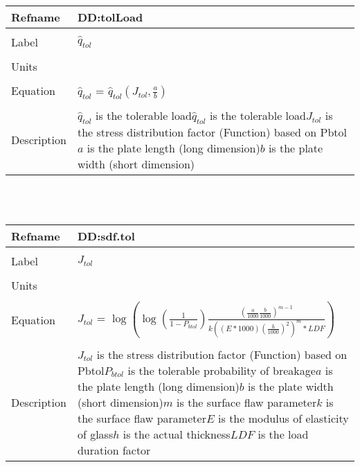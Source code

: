 \documentclass[12pt]{article}
\begin{document}
~\newline
\noindent \begin{minipage}{\textwidth}
\begin{tabular}{p{} p{}}
\toprule \textbf{Refname} & \textbf{DD:tolLoad}
\label{DD:tolLoad}
\\ \midrule \\
Label & $\hat{q}_{tol}$
\\ \midrule \\
Units & 
\\ \midrule \\
Equation & $\hat{q}_{tol}$ = $\hat{q}_{tol}(J_{tol},\frac{a}{b})$
\\ \midrule \\
Description & $\hat{q}_{tol}$ is the tolerable load\newline$\hat{q}_{tol}$ is the tolerable load\newline$J_{tol}$ is the stress distribution factor (Function) based on Pbtol\newline$a$ is the plate length (long dimension)\newline$b$ is the plate width (short dimension)
\\ \bottomrule \end{tabular}
\end{minipage}\\
~\newline
\noindent \begin{minipage}{\textwidth}
\begin{tabular}{p{} p{}}
\toprule \textbf{Refname} & \textbf{DD:sdf.tol}
\label{DD:sdf.tol}
\\ \midrule \\
Label & $J_{tol}$
\\ \midrule \\
Units & 
\\ \midrule \\
Equation & $J_{tol}$ = $\log(\log(\frac{1}{1-P_{btol}})\frac{(\frac{a}{1000}\frac{b}{1000})^{m-1}}{k((E*1000)(\frac{h}{1000})^{2})^{m}*LDF})$
\\ \midrule \\
Description & $J_{tol}$ is the stress distribution factor (Function) based on Pbtol\newline$P_{btol}$ is the tolerable probability of breakage\newline$a$ is the plate length (long dimension)\newline$b$ is the plate width (short dimension)\newline$m$ is the surface flaw parameter\newline$k$ is the surface flaw parameter\newline$E$ is the modulus of elasticity of glass\newline$h$ is the actual thickness\newline$LDF$ is the load duration factor
\\ \bottomrule \end{tabular}
\end{minipage}\\
\end{document}

